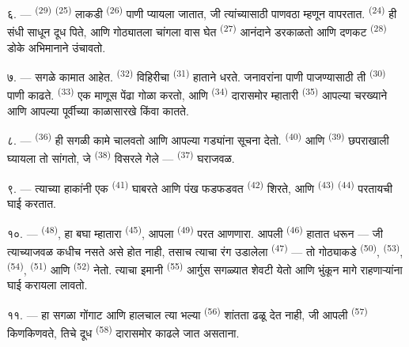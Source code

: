 ६. ---  \textsuperscript{(29)}  \textsuperscript{(25)} लाकडी
 \textsuperscript{(26)} पाणी प्यायला जातात, जी त्यांच्यासाठी पाणवठा म्हणून
वापरतात.  \textsuperscript{(24)} ही संधी साधून दूध पिते, आणि गोठ्यातला चांगला
वास घेत  \textsuperscript{(27)} आनंदाने डरकाळतो आणि दणकट 
\textsuperscript{(28)} डोके अभिमानाने उंचावतो.

७. --- सगळे कामात आहेत.  \textsuperscript{(32)} विहिरीचा 
\textsuperscript{(31)} हाताने धरते. जनावरांना पाणी पाजण्यासाठी ती 
\textsuperscript{(30)} पाणी काढते.  \textsuperscript{(33)} एक माणूस पेंढा गोळा
करतो, आणि  \textsuperscript{(34)} दारासमोर म्हातारी 
\textsuperscript{(35)} आपल्या चरख्याने आणि आपल्या  पूर्वीच्या काळासारखे
 किंवा  कातते.

\VUsaut{3.0mm}
\VUsaut{3.0mm}

८. ---  \textsuperscript{(36)} ही सगळी कामे चालवतो आणि आपल्या गड्यांना सूचना
देतो.  \textsuperscript{(40)} आणि  \textsuperscript{(39)} छपराखाली
घ्यायला तो सांगतो, जे  \textsuperscript{(38)} विसरले गेले —
 \textsuperscript{(37)} घराजवळ.

९. --- त्याच्या हाकांनी एक  \textsuperscript{(41)} घाबरते आणि पंख फडफडवत
 \textsuperscript{(42)} शिरते, आणि 
\textsuperscript{(43)}  \textsuperscript{(44)} परतायची घाई करतात.

१०. ---  \textsuperscript{(48)}, हा बघा म्हातारा 
\textsuperscript{(45)}, आपला  \textsuperscript{(49)} परत आणणारा. आपली
 \textsuperscript{(46)} हातात धरून — जी त्याच्याजवळ कधीच नसते असे होत नाही, तसाच
त्याचा रंग उडालेला  \textsuperscript{(47)} — तो गोठ्याकडे 
\textsuperscript{(50)},  \textsuperscript{(53)}, 
\textsuperscript{(54)},  \textsuperscript{(51)} आणि 
\textsuperscript{(52)} नेतो. त्याचा इमानी  \textsuperscript{(55)} आर्गुस
सगळ्यात शेवटी येतो आणि भुंकून मागे राहणाऱ्यांना घाई करायला लावतो.

११. --- हा सगळा गोंगाट आणि हालचाल त्या भल्या  \textsuperscript{(56)}
शांतता ढळू देत नाही, जी आपली  \textsuperscript{(57)} किणकिणवते, तिचे दूध
 \textsuperscript{(58)} दारासमोर काढले जात असताना.

